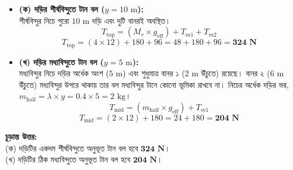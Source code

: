 \documentclass[12pt, a4paper]{article}
\begin{document}
\begin{tcolorbox}[solutionbox={সমাধান (Solution)}]
\begin{itemize}[leftmargin=*, parsep=0.5ex]
    \item \textbf{(ক) দড়ির শীর্ষবিন্দুতে টান বল ($y = 10\text{ m}$):} \\
    শীর্ষবিন্দুর নিচে পুরো $10\text{ m}$ দড়ি এবং দুটি বানরই অবস্থিত।
    \[ T_{\text{top}} = (M_r \times g_{\text{eff}}) + T_{m1} + T_{m2} \]
    \[ T_{\text{top}} = (4 \times 12) + 180 + 96 = 48 + 180 + 96 = \mathbf{324\text{ N}} \]
    
    \item \textbf{(খ) দড়ির মধ্যবিন্দুতে টান বল ($y = 5\text{ m}$):} \\
    মধ্যবিন্দুর নিচে দড়ির অর্ধেক অংশ ($5\text{ m}$) এবং শুধুমাত্র বানর ১ ($2\text{ m}$ উঁচুতে) রয়েছে। বানর ২ ($6\text{ m}$ উঁচুতে) মধ্যবিন্দুর উপরে থাকায় তার বল মধ্যবিন্দুর টানে কোনো ভূমিকা রাখবে না।
    নিচের অর্ধেক দড়ির ভর, $m_{\text{half}} = \lambda \times y = 0.4 \times 5 = 2\text{ kg}$।
    \[ T_{\text{mid}} = (m_{\text{half}} \times g_{\text{eff}}) + T_{m1} \]
    \[ T_{\text{mid}} = (2 \times 12) + 180 = 24 + 180 = \mathbf{204\text{ N}} \]
\end{itemize}

\vspace{1em}
\begin{tcolorbox}[answerbox]
\textbf{চূড়ান্ত উত্তর:} \\
(ক) দড়িটির একদম শীর্ষবিন্দুতে অনুভূত টান বল হবে $\mathbf{324\text{ N}}$। \\
(খ) দড়িটির ঠিক মধ্যবিন্দুতে অনুভূত টান বল হবে $\mathbf{204\text{ N}}$।
\end{tcolorbox}
\end{tcolorbox}
\end{document}
